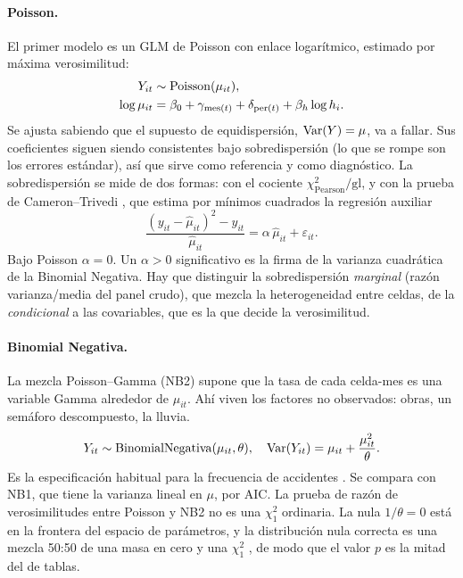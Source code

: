\paragraph{Poisson.} El primer modelo es un GLM de Poisson con enlace
logarítmico, estimado por máxima verosimilitud:
\begin{equation}
	\begin{aligned}
		Y_{it}        & \sim \mathrm{Poisson}(\mu_{it}),                \\
		\log \mu_{it} & = \beta_0 + \gamma_{\mathrm{mes}(t)}
		+ \delta_{\mathrm{per}(t)} + \beta_h \log h_i .
	\end{aligned}
\end{equation}
Se ajusta sabiendo que el supuesto de equidispersión,
$\mathrm{Var}(Y) = \mu$, va a fallar. Sus coeficientes siguen siendo consistentes
bajo sobredispersión (lo que se rompe son los errores estándar), así que
sirve como referencia y como diagnóstico. La sobredispersión se mide de dos
formas: con el cociente $\chi^2_{\text{Pearson}}/\text{gl}$, y con la prueba
de Cameron--Trivedi \parencite{cameron1990regression}, que estima por mínimos
cuadrados la regresión auxiliar
\begin{equation}
	\frac{(y_{it} - \hat\mu_{it})^2 - y_{it}}{\hat\mu_{it}}
	= \alpha\, \hat\mu_{it} + \varepsilon_{it}.
\end{equation}
Bajo Poisson $\alpha = 0$. Un $\alpha > 0$ significativo es la firma de la
varianza cuadrática de la Binomial Negativa. Hay que distinguir la
sobredispersión \emph{marginal} (razón varianza/media del panel crudo), que
mezcla la heterogeneidad entre celdas, de la \emph{condicional} a las
covariables, que es la que decide la verosimilitud.

\paragraph{Binomial Negativa.} La mezcla Poisson--Gamma (NB2) supone que la
tasa de cada celda-mes es una variable Gamma alrededor de $\mu_{it}$. Ahí
viven los factores no observados: obras, un semáforo descompuesto, la lluvia.
\begin{equation}
	Y_{it} \sim \mathrm{BinomialNegativa}(\mu_{it}, \theta),
	\quad \mathrm{Var}(Y_{it}) = \mu_{it} + \frac{\mu_{it}^2}{\theta}.
\end{equation}
Es la especificación habitual para la frecuencia de accidentes
\parencite{lord2010statistical}. Se compara con NB1, que tiene la varianza lineal
en $\mu$, por AIC. La prueba de razón de verosimilitudes entre Poisson y NB2
no es una $\chi^2_1$ ordinaria. La nula $1/\theta = 0$ está en la frontera del
espacio de parámetros, y la distribución nula correcta es una mezcla 50:50
de una masa en cero y una $\chi^2_1$ \parencite{self1987asymptotic}, de modo que
el valor $p$ es la mitad del de tablas.

